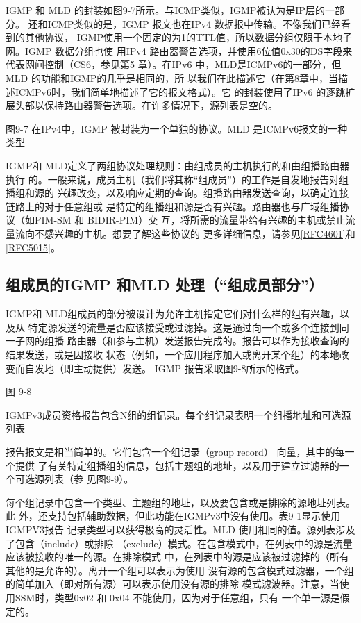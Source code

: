 IGMP 和 MLD 的封装如图9-7所示。与ICMP类似，IGMP被认为是IP层的一部分。
还和ICMP类似的是，IGMP 报文也在IPv4 数据报中传输。不像我们已经看到的其他协议，
IGMP使用一个固定的为1的TTL值，所以数据分组仅限于本地子网。IGMP 数据分组也使
用IPv4 路由器警告选项，并使用6位值0x30的DS字段来代表网间控制（CS6，参见第5
章）。在IPv6 中，MLD是ICMPv6的一部分，但 MLD 的功能和IGMP的几乎是相同的，所
以我们在此描述它（在第8章中，当描述ICMPv6时，我们简单地描述了它的报文格式）。它
的封装使用了IPv6 的逐跳扩展头部以保持路由器警告选项。在许多情况下，源列表是空的。

图9-7 在IPv4中，IGMP 被封装为一个单独的协议。MLD 是ICMPv6报文的一种类型

IGMP和 MLD定义了两组协议处理规则：由组成员的主机执行的和由组播路由器执行
的。一般来说，成员主机（我们将其称“组成员”）的工作是自发地报告对组播组和源的
兴趣改变，以及响应定期的查询。组播路由器发送查询，以确定连接链路上的对于任意组或
是特定的组播组和源是否有兴趣。路由器也与广域组播协议（如PIM-SM 和 BIDIR-PIM）交
互，将所需的流量带给有兴趣的主机或禁止流量流向不感兴趣的主机。想要了解这些协议的
更多详细信息，请参见\href{https://www.rfc-editor.org/rfc/rfc4601}{[RFC4601]}和
\href{https://www.rfc-editor.org/rfc/rfc5015}{[RFC5015]}。

\subsection{组成员的IGMP 和MLD 处理（“组成员部分”）}
IGMP和 MLD组成员的部分被设计为允许主机指定它们对什么样的组有兴趣，以及从
特定源发送的流量是否应该接受或过滤掉。这是通过向一个或多个连接到同一子网的组播
路由器（和参与主机）发送报告完成的。报告可以作为接收查询的结果发送，或是因接收
状态（例如，一个应用程序加入或离开某个组）的本地改变而自发地（即主动提供）发送。
IGMP 报告采取图9-8所示的格式。

图 9-8

IGMPv3成员资格报告包含N组的组记录。每个组记录表明一个组播地址和可选源列表

报告报文是相当简单的。它们包含一个组记录（group record） 向量，其中的每一个提供
了有关特定组播组的信息，包括主题组的地址，以及用于建立过滤器的一个可选源列表（参
见图9-9）。

每个组记录中包含一个类型、主题组的地址，以及要包含或是排除的源地址列表。此
外，还支持包括辅助数据，但此功能在IGMPv3中没有使用。表9-1显示使用IGMPV3报告
记录类型可以获得极高的灵活性。MLD 使用相同的值。源列表涉及了包含（include）或排除
（exclude）模式。在包含模式中，在列表中的源是流量应该被接收的唯一的源。在排除模式
中，在列表中的源是应该被过滤掉的（所有其他的是允许的）。离开一个组可以表示为使用
没有源的包含模式过滤器，一个组的简单加入（即对所有源）可以表示使用没有源的排除
模式滤波器。注意，当使用SSM时，类型0x02 和 0x04 不能使用，因为对于任意组，只有
一个单一源是假定的。

